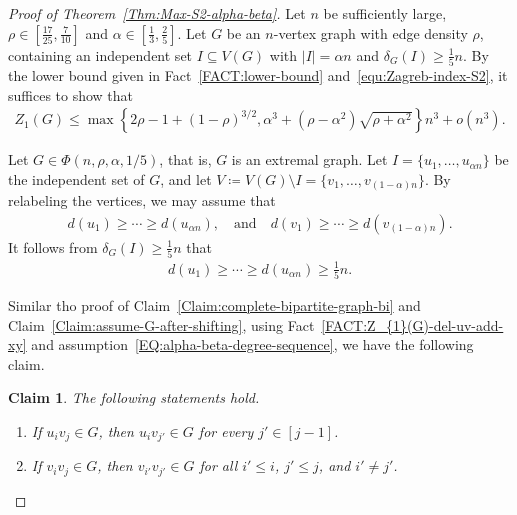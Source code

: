 \documentclass[11pt,a4paper]{article}
\newtheorem{claim}[definition]{Claim}
\begin{document}
\begin{proof}[Proof of Theorem~\ref{Thm:Max-S2-alpha-beta}]
Let $n$ be sufficiently large, $\rho \in \left[\frac{17}{25}, \frac{7}{10}\right]$ and $\alpha \in \left[\frac{1}{3}, \frac{2}{5}\right]$. 
Let $G$ be an $n$-vertex graph with edge density $\rho$, containing an independent set $I \subseteq V(G)$ with $|I| = \alpha n$ and $\delta_G(I) \ge \tfrac{1}{5}n$. 
By the lower bound given in Fact~\ref{FACT:lower-bound} and~\eqref{equ:Zagreb-index-S2}, it suffices to show that 
\begin{align*}
Z_{1}(G) 
\le \max\left\{2\rho -1 +(1-\rho)^{3/2}, \alpha^3+(\rho-\alpha^2) \sqrt{\rho+\alpha^2}\right\} n^3 + o(n^3). 
\end{align*}

Let $G \in \Phi(n, \rho, \alpha, 1/5)$, that is, $G$ is an extremal graph. 
Let $I = \{u_1,\ldots,u_{\alpha n}\}$ be the independent set of $G$, and let $V \coloneqq V(G) \setminus I = \{v_1,\ldots, v_{(1-\alpha)n}\}$. 
By relabeling the vertices, we may assume that 
\begin{align}\label{EQ:alpha-beta-degree-sequence}
d(u_1) \ge \cdots \ge d(u_{\alpha n}), 
\quad \text{and} \quad
d(v_1) \ge \cdots \ge d(v_{(1-\alpha)n}). 
\end{align}
It follows from $\delta_{G}(I) \ge \tfrac{1}{5}n$ that
\begin{align}\label{EQ:alpha-beta-degree>0.2n}
d(u_1) \ge \cdots \ge d(u_{\alpha n}) \ge \frac{1}{5}n.  
\end{align}

Similar tho proof of Claim~\ref{Claim:complete-bipartite-graph-bi} and Claim~\ref{Claim:assume-G-after-shifting}, using Fact~\ref{FACT:Z_{1}(G)-del-uv-add-xy} and assumption~\eqref{EQ:alpha-beta-degree-sequence}, we have the following claim. 

\begin{claim}\label{Claim:assume-G-after-shifting-n/5}
The following statements hold.  
\begin{enumerate}[label=(\roman*)]
\item \label{ITEM:alpha-beta-ui-vj-complete} If $u_iv_j \in G$, then  $u_iv_{j'} \in G$ for every $j' \in [j-1]$. 
\item \label{ITEM:alpha-beta-vi-vj-complete} If $v_iv_j\in G$, then $v_{i'}v_{j'} \in G$ for all $i' \le i$, $j' \le j$, and $i' \neq j'$.
\end{enumerate}
\end{claim}


\end{proof}
\end{document}
